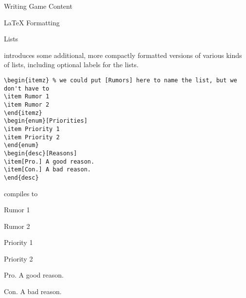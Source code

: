 \documentclass[sheet]{GameTexBase}
\begin{document}
\begin{section}{Writing Game Content}
\begin{subsection}{\LaTeX{} Formatting}
\begin{subsubsection}{\gametex{} Lists}

\gametex{} introduces some additional, more compactly formatted versions of various kinds of lists, including optional labels for the lists.

\begin{verbatim}
\begin{itemz} % we could put [Rumors] here to name the list, but we don't have to
\item Rumor 1
\item Rumor 2
\end{itemz}
\begin{enum}[Priorities]
\item Priority 1
\item Priority 2
\end{enum}
\begin{desc}[Reasons]
\item[Pro.] A good reason.
\item[Con.] A bad reason.
\end{desc}
\end{verbatim}
compiles to 
\begin{itemz} %
\item Rumor 1
\item Rumor 2
\end{itemz}
\begin{enum}[Priorities]
\item Priority 1
\item Priority 2
\end{enum}
\begin{desc}[Reasons]
\item[Pro.] A good reason.
\item[Con.] A bad reason.
\end{desc}
\end{subsubsection}
\end{subsection}
\end{section}
\end{document}
